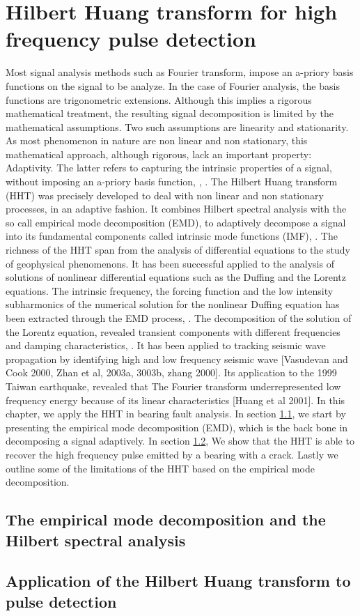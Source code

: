 \documentclass[../Main/thesis.tex]{subfiles}
\begin{document}
\chapter[Hilbert Huang transform for high frequency pulse detection]{Hilbert Huang transform for high frequency pulse detection}
\label{sec:hht}

Most signal analysis methods such as Fourier transform, impose an a-priory basis functions on the signal to be analyze. In the case of Fourier analysis, the basis functions are trigonometric extensions. Although this implies a rigorous mathematical treatment, the resulting signal decomposition is limited by the mathematical assumptions. Two such assumptions are linearity and stationarity. As most phenomenon in nature are non linear and non stationary, this mathematical approach, although rigorous, lack an important property: Adaptivity. The latter refers to capturing the intrinsic properties of a signal, without imposing an a-priory basis function, \cite{huang98}, \cite{huang08}. 
\justify 
The Hilbert Huang transform (HHT) was precisely developed to deal with non linear and non stationary processes, in an adaptive fashion. It combines Hilbert spectral analysis with the so call empirical mode decomposition (EMD), to adaptively decompose a signal into its fundamental components called intrinsic mode functions (IMF), \cite{huang98}.
The richness of the HHT span from the analysis of differential equations to the study of geophysical phenomenons. It has been successful applied to the analysis of solutions of nonlinear differential equations such as the Duffing and the Lorentz equations. The intrinsic frequency, the forcing function and the low intensity subharmonics of the numerical solution for the nonlinear Duffing equation has been extracted through the EMD process, \cite{huang98}. The decomposition of the solution of the Lorentz equation, revealed transient components with different frequencies and damping characteristics, \cite{huang98}. It has been applied to tracking seismic wave propagation by identifying high and low frequency seismic wave [Vasudevan and Cook 2000, Zhan et al, 2003a, 3003b, zhang 2000]. Its application to the 1999 Taiwan earthquake, revealed that The Fourier transform underrepresented low frequency energy because of its linear characteristics [Huang et al 2001]. In this chapter, we apply the HHT in bearing fault analysis.
\justify
In section \ref{sec:emd}, we start by presenting the empirical mode decomposition (EMD), which is the back bone in decomposing a signal adaptively. In section \ref{sec:pulse}, We show that the HHT is able to recover the high frequency pulse emitted by a bearing with a crack. Lastly we outline some of the limitations of the HHT based on the empirical mode decomposition.
\justify
\section{The empirical mode decomposition and the Hilbert spectral analysis}
\label{sec:emd}

\section{Application of the Hilbert Huang transform to pulse detection }
\label{sec:pulse}



\blankpage
\end{document}
